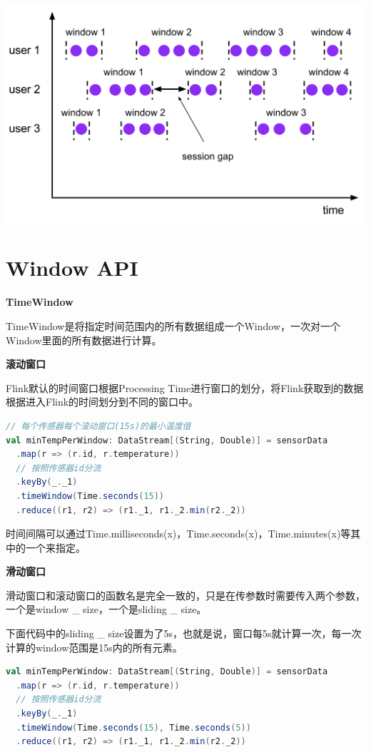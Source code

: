 \documentclass[oneside]{ctexbook}
\begin{document}
\noindent \includegraphics[width=\textwidth]{session-windows.png}

\section{Window API}

\textbf{TimeWindow}

TimeWindow是将指定时间范围内的所有数据组成一个Window，一次对一个Window里面的所有数据进行计算。

\textbf{滚动窗口}

Flink默认的时间窗口根据Processing Time进行窗口的划分，将Flink获取到的数据根据进入Flink的时间划分到不同的窗口中。

\begin{lstlisting}[language=scala]
// 每个传感器每个滚动窗口(15s)的最小温度值
val minTempPerWindow: DataStream[(String, Double)] = sensorData
  .map(r => (r.id, r.temperature))
  // 按照传感器id分流
  .keyBy(_._1)
  .timeWindow(Time.seconds(15))
  .reduce((r1, r2) => (r1._1, r1._2.min(r2._2))
\end{lstlisting}

时间间隔可以通过Time.milliseconds(x)，Time.seconds(x)，Time.minutes(x)等其中的一个来指定。

\textbf{滑动窗口}

滑动窗口和滚动窗口的函数名是完全一致的，只是在传参数时需要传入两个参数，一个是window \_ size，一个是sliding \_ size。

下面代码中的sliding \_ size设置为了5s，也就是说，窗口每5s就计算一次，每一次计算的window范围是15s内的所有元素。

\begin{lstlisting}[language=scala]
val minTempPerWindow: DataStream[(String, Double)] = sensorData
  .map(r => (r.id, r.temperature))
  // 按照传感器id分流
  .keyBy(_._1)
  .timeWindow(Time.seconds(15), Time.seconds(5))
  .reduce((r1, r2) => (r1._1, r1._2.min(r2._2))
\end{lstlisting}
\end{document}
